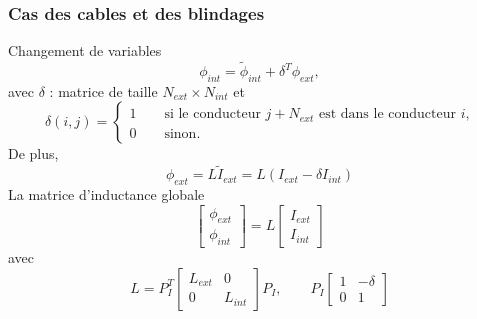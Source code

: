 \begin{frame}
\frametitle{Cas des cables et des blindages}
Changement de variables
\begin{equation}
\phi_{int} = \tilde{\phi}_{int} +\delta^T \phi_{ext},
\end{equation}
avec $\delta$ : matrice de taille $N_{ext}\times N_{int}$ et
\begin{equation}
\delta(i,j)=
\begin{cases}
1 \qquad \text{si le conducteur $j+N_{ext}$ est dans le conducteur $i$,} \\
0 \qquad \text{sinon.}
\end{cases}
\end{equation}
De plus, 
\begin{equation}
\phi_{ext} = L\tilde{I}_{ext}=L(I_{ext}-\delta I_{int})
\end{equation}
La matrice d'inductance globale
\[ \left[ \begin{array} {c}
\phi_{ext} \\
\phi_{int} \end{array}  \right]  = 
L
 \left[ \begin{array} {c}
I_{ext} \\
I_{int} \end{array}  \right] 
\] 
avec
\[ L = P_I^T \left[ \begin{array} {cc}
L_{ext} &0 \\
0 & L_{int} \end{array}  \right] P_I , \qquad 
P_I
\left[ \begin{array} {cc}
1 & -\delta \\
0 & 1 \end{array}  \right]
 \] 

\end{frame}
